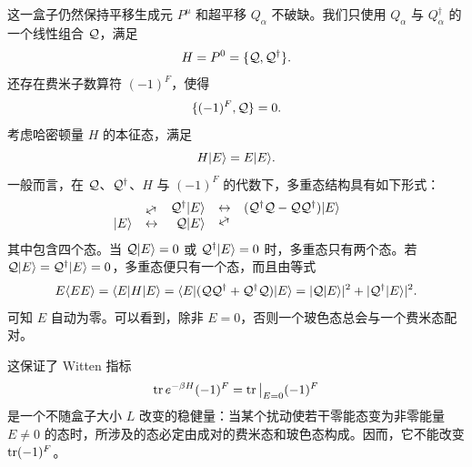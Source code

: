 这一盒子仍然保持平移生成元 $P^\mu$ 和超平移 $Q_\alpha$ 不破缺。我们只使用 $Q_\alpha$ 与 $Q_\alpha^\dagger$ 的一个线性组合 $\mathcal{Q}$，满足
\begin{equation}
H=P^0=  \{\mathcal{Q},\mathcal{Q}^\dagger\}.
\end{equation}
还存在费米子数算符 $(-1)^F$，使得
\begin{equation}
\{(-1)^F,\mathcal{Q}\}=0.
\end{equation}
考虑哈密顿量 $H$ 的本征态，满足
\begin{equation}
H|E\rangle=E|E\rangle.
\end{equation}
一般而言，在 $\mathcal{Q}$、$\mathcal{Q}^\dagger$、$H$ 与 $(-1)^F$ 的代数下，多重态结构具有如下形式：
\begin{equation}
\begin{array}{ccccc@{\qquad}c}
&\raisebox{-.8ex}{\rotatebox{30}{$\leftrightarrow$}}& \cQ^\dagger \ket{E} & \leftrightarrow & (\cQ^\dagger\cQ-\cQ\cQ^\dagger)\ket{E} \\
\ket{E} & \leftrightarrow & \phantom{^\dagger}\cQ\ket{E} &  \rotatebox{30}{$\leftrightarrow$}
\end{array}
\end{equation}
其中包含四个态。当 $\mathcal{Q}|E\rangle=0$ 或 $\mathcal{Q}^\dagger|E\rangle=0$ 时，多重态只有两个态。若 $\mathcal{Q}|E\rangle=\mathcal{Q}^\dagger|E\rangle=0$，多重态便只有一个态，而且由等式
\begin{equation}
E\langle EE\rangle
=\langle E|H|E\rangle
=\langle E|(\mathcal{Q} \mathcal{Q}^\dagger+\mathcal{Q}^\dagger \mathcal{Q})|E\rangle=
|\mathcal{Q}|E\rangle|^2+
|\mathcal{Q}^\dagger|E\rangle|^2 .
\end{equation}
可知 $E$ 自动为零。可以看到，除非 $E=0$，否则一个玻色态总会与一个费米态配对。

这保证了 Witten 指标
\begin{equation}
\mathop{\mathrm{tr}}\nolimits e^{-\beta H} (-1)^F =\mathop{\mathrm{tr}}\nolimits\big|_{E=0} (-1)^F
\end{equation}
是一个不随盒子大小 $L$ 改变的稳健量：当某个扰动使若干零能态变为非零能量 $E\neq0$ 的态时，所涉及的态必定由成对的费米态和玻色态构成。因而，它不能改变 $\mathop{\mathrm{tr}}\nolimits(-1)^F$。

